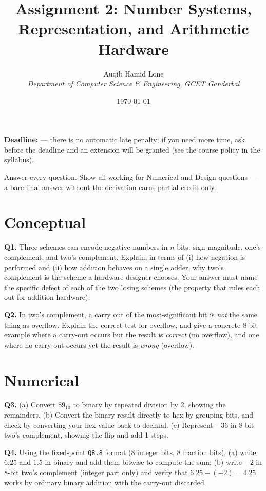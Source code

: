 \documentclass[11pt]{article}
\title{Assignment 2: Number Systems, Representation, and Arithmetic Hardware}
\author{Auqib Hamid Lone\\[0.3em]
  \emph{Department of Computer Science \& Engineering}, \emph{GCET Ganderbal}}
\date{\today}
\begin{document}
\maketitle

\noindent\textbf{Deadline:}  --- there is no automatic late penalty; if you need more time, ask before the deadline and an extension will be granted (see the course policy in the syllabus).

\noindent Answer every question. Show all working for Numerical and Design questions --- a bare final answer without the derivation earns partial credit only.

\section{Conceptual}

\textbf{Q1.} Three schemes can encode negative numbers in $n$ bits: sign-magnitude, one's complement, and two's complement. Explain, in terms of (i) how negation is performed and (ii) how addition behaves on a single adder, why two's complement is the scheme a hardware designer chooses. Your answer must name the specific defect of each of the two losing schemes (the property that rules each out for addition hardware).

\textbf{Q2.} In two's complement, a carry out of the most-significant bit is \emph{not} the same thing as overflow. Explain the correct test for overflow, and give a concrete 8-bit example where a carry-out occurs but the result is \emph{correct} (no overflow), and one where no carry-out occurs yet the result is \emph{wrong} (overflow).

\section{Numerical}

\textbf{Q3.} (a) Convert $89_{10}$ to binary by repeated division by 2, showing the remainders. (b) Convert the binary result directly to hex by grouping bits, and check by converting your hex value back to decimal. (c) Represent $-36$ in 8-bit two's complement, showing the flip-and-add-1 steps.

\textbf{Q4.} Using the fixed-point \texttt{Q8.8} format (8 integer bits, 8 fraction bits), (a) write $6.25$ and $1.5$ in binary and add them bitwise to compute the sum; (b) write $-2$ in 8-bit two's complement (integer part only) and verify that $6.25 + (-2) = 4.25$ works by ordinary binary addition with the carry-out discarded.
\end{document}
